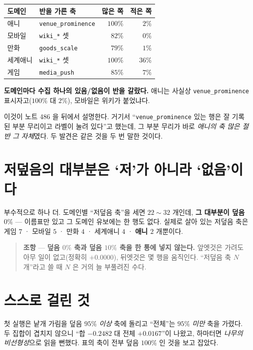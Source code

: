 \documentclass[11pt]{article}
\begin{document}
\begin{center}
\begin{tabular}{llrr}
\hline
도메인 & 반을 가른 축 & 많은 쪽 & 적은 쪽 \\
\hline
애니 & \texttt{venue\_prominence} & $100\%$ & $2\%$ \\
모바일 & \texttt{wiki\_*} 셋 & $82\%$ & $0\%$ \\
만화 & \texttt{goods\_scale} & $79\%$ & $1\%$ \\
세계애니 & \texttt{wiki\_*} 셋 & $100\%$ & $36\%$ \\
게임 & \texttt{media\_push} & $85\%$ & $7\%$ \\
\hline
\end{tabular}
\end{center}

\textbf{도메인마다 수집 하나의 있음/없음이 반을 갈랐다.} 애니는 사실상
\texttt{venue\_prominence} 표시자고($100\%$ 대 $2\%$), 모바일은 위키가
붙었냐다.

이것이 노트 486 을 뒤에서 설명한다. 거기서 ``\texttt{venue\_prominence}
있는 행은 잘 기록된 부분 무리이고 라벨이 눌려 있다''고 했는데, 그
부분 무리가 바로 \emph{애니의 축 많은 절반 그 자체}였다. 두 발견은 같은
것을 두 번 말한 것이다.

\section{저덮음의 대부분은 `저'가 아니라 `없음'이다}

부수적으로 하나 더. 도메인별 ``저덮음 축''을 세면 $22 \sim 32$ 개인데,
\textbf{그 대부분이 덮음 $0\%$} --- 이름표만 있고 그 도메인 유보에는 한
행도 없다. 실제로 살아 있는 저덮음 축은 게임 $7$ · 모바일 $5$ · 만화 $4$
· 세계애니 $4$ · \textbf{애니 $2$} 개뿐이다.

\begin{quote}
\textbf{조항} --- \textbf{덮음 $0\%$ 축과 덮음 $10\%$ 축을 한 통에 넣지
않는다.} 앞엣것은 가려도 아무 일이 없고(정확히 $+0.0000$), 뒤엣것은
몇 행을 움직인다. ``저덮음 축 $N$ 개''라고 쓸 때 $N$ 은 거의 늘 부풀려진
수다.
\end{quote}

\section{스스로 걸린 것}

첫 실행은 낱개 가림을 덮음 $95\%$ \emph{이상} 축에 돌리고 ``전체''는
$95\%$ \emph{미만} 축을 가렸다. 두 집합이 겹치지 않으니 ``합
$-0.2482$ 대 전체 $+0.0167$''이 나왔고, 하마터면 \emph{나무의
비선형성}으로 읽을 뻔했다. 표의 축이 전부 덮음 $100\%$ 인 것을 보고
잡았다.
\end{document}
